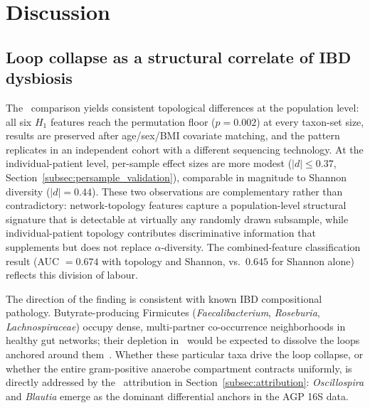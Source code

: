 \section{Discussion}
\label{sec:discussion}

\subsection{Loop collapse as a structural correlate of IBD dysbiosis}

The \ibd\ comparison yields consistent topological differences at the
population level: all six $H_1$ features reach the permutation floor
($p = 0.002$) at every taxon-set size, results are preserved after age/sex/BMI
covariate matching, and the pattern replicates in an independent cohort
with a different sequencing technology.
At the individual-patient level, per-sample effect sizes are more modest
($|d| \leq 0.37$, Section~\ref{subsec:persample_validation}), comparable
in magnitude to Shannon diversity ($|d| = 0.44$).
These two observations are complementary rather than contradictory:
network-topology features capture a population-level structural signature
that is detectable at virtually any randomly drawn subsample, while
individual-patient topology contributes discriminative information that
supplements but does not replace $\alpha$-diversity.
The combined-feature classification result (AUC $= 0.674$ with topology
and Shannon, vs.\ $0.645$ for Shannon alone) reflects this division of
labour.

The direction of the finding is consistent with known IBD compositional
pathology.
Butyrate-producing Firmicutes (\textit{Faecalibacterium},
\textit{Roseburia}, \textit{Lachnospiraceae}) occupy dense, multi-partner
co-occurrence neighborhoods in healthy gut networks; their depletion in
\ibd\ would be expected to dissolve the loops anchored around
them~\citep{gevers2014treatment,halfvarson2017dynamics}.
Whether these particular taxa drive the loop collapse, or whether the
entire gram-positive anaerobe compartment contracts uniformly, is directly
addressed by the \loo\ attribution in Section~\ref{subsec:attribution}:
\textit{Oscillospira} and \textit{Blautia} emerge as the dominant
differential anchors in the AGP 16S data.


